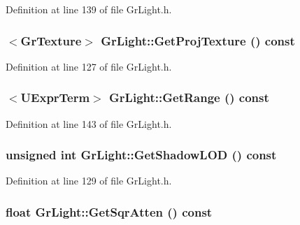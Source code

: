 Definition at line 139 of file GrLight.h.\hypertarget{class_gr_light_739b15eaf5c39ae1937546644aab1e42}{
\subsubsection[{GetProjTexture}]{$<${\bf GrTexture}$>$ GrLight::GetProjTexture () const}}
\label{class_gr_light_739b15eaf5c39ae1937546644aab1e42}




Definition at line 127 of file GrLight.h.\hypertarget{class_gr_light_dcbb6c218efd950cb13e09851ad83c5a}{
\subsubsection[{GetRange}]{$<${\bf UExprTerm}$>$ GrLight::GetRange () const}}
\label{class_gr_light_dcbb6c218efd950cb13e09851ad83c5a}




Definition at line 143 of file GrLight.h.\hypertarget{class_gr_light_324455a77bfa680b7bbb50e7e2950ae9}{
\subsubsection[{GetShadowLOD}]{\setlength{\rightskip}{0pt plus 5cm}unsigned int GrLight::GetShadowLOD () const}}
\label{class_gr_light_324455a77bfa680b7bbb50e7e2950ae9}




Definition at line 129 of file GrLight.h.\hypertarget{class_gr_light_6050783fa4ab84ed938d695ba409dd67}{
\subsubsection[{GetSqrAtten}]{\setlength{\rightskip}{0pt plus 5cm}float GrLight::GetSqrAtten () const}}
\label{class_gr_light_6050783fa4ab84ed938d695ba409dd67}




